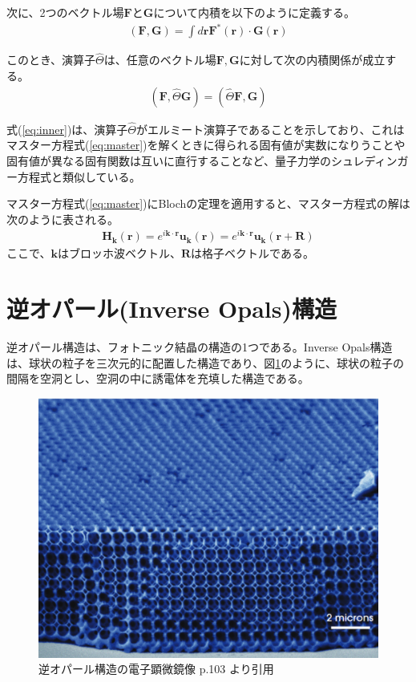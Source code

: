\documentclass[platex,dvipdfmx,draft]{jsreport}
\numberwithin{equation}{section}
\begin{document}
次に、2つのベクトル場$\bm{F}$と$\bm{G}$について内積を以下のように定義する。
\begin{align}
  (\bm{F}, \bm{G}) = \int d\bm{r} \bm{F}^*(\bm{r}) \cdot \bm{G}(\bm{r})
\end{align}

このとき、演算子$\hat{\Theta}$は、任意のベクトル場$\bm{F}, \bm{G}$に対して次の内積関係が成立する。
\begin{align}
  \label{eq:inner}
  (\bm{F}, \hat{\Theta} \bm{G}) = (\hat{\Theta} \bm{F}, \bm{G})
\end{align}

式(\ref{eq:inner})は、演算子$\hat{\Theta}$がエルミート演算子であることを示しており、これはマスター方程式(\ref{eq:master})を解くときに得られる固有値が実数になりうことや固有値が異なる固有関数は互いに直行することなど、量子力学のシュレディンガー方程式と類似している。

マスター方程式(\ref{eq:master})にBlochの定理を適用すると、マスター方程式の解は次のように表される。
\begin{align}
  \bm{H}_{\bm{k}}(\bm{r}) = e^{i \bm{k} \cdot \bm{r}} \bm{u}_{\bm{k}}(\bm{r}) = e^{i \bm{k} \cdot \bm{r}} \bm{u}_{\bm{k}}(\bm{r + R})
\end{align}
ここで、$\bm{k}$はブロッホ波ベクトル、$\bm{R}$は格子ベクトルである。

\section{逆オパール(Inverse Opals)構造}
逆オパール構造は、フォトニック結晶の構造の1つである。Inverse Opals構造は、球状の粒子を三次元的に配置した構造であり、図\ref{fig:inverse_opals}のように、球状の粒子の間隔を空洞とし、空洞の中に誘電体を充填した構造である。
\begin{figure}[htbp]
  \centering
  \includegraphics[width=0.6\linewidth]{inv_opals.png}
  \caption{逆オパール構造の電子顕微鏡像 \cite{text} p.103 より引用}
  \label{fig:inverse_opals}

\end{figure}
\end{document}
